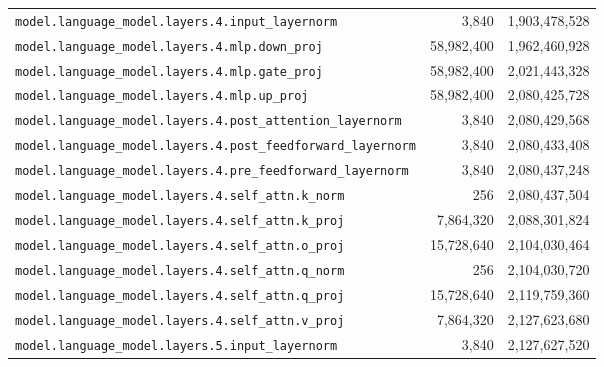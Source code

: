\documentclass[10pt,a4paper]{article}
\theoremstyle{definition}
\begin{document}
\begin{appendices}
\begin{longtable}{p{9.5cm}rr}
\texttt{model.\allowbreak{}language\_model.\allowbreak{}layers.\allowbreak{}4.\allowbreak{}input\_layernorm} & 3,840 & 1,903,478,528 \\
\texttt{model.\allowbreak{}language\_model.\allowbreak{}layers.\allowbreak{}4.\allowbreak{}mlp.\allowbreak{}down\_proj} & 58,982,400 & 1,962,460,928 \\
\texttt{model.\allowbreak{}language\_model.\allowbreak{}layers.\allowbreak{}4.\allowbreak{}mlp.\allowbreak{}gate\_proj} & 58,982,400 & 2,021,443,328 \\
\texttt{model.\allowbreak{}language\_model.\allowbreak{}layers.\allowbreak{}4.\allowbreak{}mlp.\allowbreak{}up\_proj} & 58,982,400 & 2,080,425,728 \\
\texttt{model.\allowbreak{}language\_model.\allowbreak{}layers.\allowbreak{}4.\allowbreak{}post\_attention\_layernorm} & 3,840 & 2,080,429,568 \\
\texttt{model.\allowbreak{}language\_model.\allowbreak{}layers.\allowbreak{}4.\allowbreak{}post\_feedforward\_layernorm} & 3,840 & 2,080,433,408 \\
\texttt{model.\allowbreak{}language\_model.\allowbreak{}layers.\allowbreak{}4.\allowbreak{}pre\_feedforward\_layernorm} & 3,840 & 2,080,437,248 \\
\texttt{model.\allowbreak{}language\_model.\allowbreak{}layers.\allowbreak{}4.\allowbreak{}self\_attn.\allowbreak{}k\_norm} & 256 & 2,080,437,504 \\
\texttt{model.\allowbreak{}language\_model.\allowbreak{}layers.\allowbreak{}4.\allowbreak{}self\_attn.\allowbreak{}k\_proj} & 7,864,320 & 2,088,301,824 \\
\texttt{model.\allowbreak{}language\_model.\allowbreak{}layers.\allowbreak{}4.\allowbreak{}self\_attn.\allowbreak{}o\_proj} & 15,728,640 & 2,104,030,464 \\
\texttt{model.\allowbreak{}language\_model.\allowbreak{}layers.\allowbreak{}4.\allowbreak{}self\_attn.\allowbreak{}q\_norm} & 256 & 2,104,030,720 \\
\texttt{model.\allowbreak{}language\_model.\allowbreak{}layers.\allowbreak{}4.\allowbreak{}self\_attn.\allowbreak{}q\_proj} & 15,728,640 & 2,119,759,360 \\
\texttt{model.\allowbreak{}language\_model.\allowbreak{}layers.\allowbreak{}4.\allowbreak{}self\_attn.\allowbreak{}v\_proj} & 7,864,320 & 2,127,623,680 \\
\texttt{model.\allowbreak{}language\_model.\allowbreak{}layers.\allowbreak{}5.\allowbreak{}input\_layernorm} & 3,840 & 2,127,627,520 \\

\end{longtable}
\end{appendices}
\end{document}
